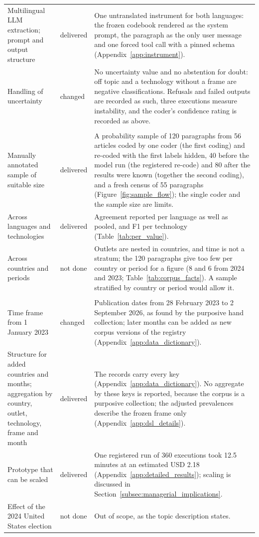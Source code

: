\begin{longtable}{@{}>{\raggedright\arraybackslash}p{32mm}>{\raggedright\arraybackslash}p{14mm}>{\raggedright\arraybackslash}p{106mm}@{}}
Multilingual LLM extraction; prompt and output structure & delivered & One untranslated instrument for both languages: the frozen codebook rendered as the system prompt, the paragraph as the only user message and one forced tool call with a pinned schema (Appendix~\ref{app:instrument}). \\
Handling of uncertainty & changed & No uncertainty value and no abstention for doubt: off topic and a technology without a frame are negative classifications. Refusals and failed outputs are recorded as such, three executions measure instability, and the coder's confidence rating is recorded as above. \\
\multicolumn{3}{@{}l}{\emph{Validation}} \\
Manually annotated sample of suitable size & delivered & A probability sample of 120 paragraphs from 56 articles coded by one coder (the first coding) and re-coded with the first labels hidden, 40 before the model run (the registered re-code) and 80 after the results were known (together the second coding), and a fresh census of 55 paragraphs (Figure~\ref{fig:sample_flow}); the single coder and the sample size are limits. \\
Across languages and technologies & delivered & Agreement reported per language as well as pooled, and F1 per technology (Table~\ref{tab:per_value}). \\
Across countries and periods & not done & Outlets are nested in countries, and time is not a stratum; the 120 paragraphs give too few per country or period for a figure (8 and 6 from 2024 and 2023; Table~\ref{tab:corpus_facts}). A sample stratified by country or period would allow it. \\
\multicolumn{3}{@{}l}{\emph{Time frame, data structure and scope}} \\
Time frame from 1 January 2023 & changed & Publication dates from 28 February 2023 to 2 September 2026, as found by the purposive hand collection; later months can be added as new corpus versions of the registry (Appendix~\ref{app:data_dictionary}). \\
Structure for added countries and months; aggregation by country, outlet, technology, frame and month & delivered & The records carry every key (Appendix~\ref{app:data_dictionary}). No aggregate by these keys is reported, because the corpus is a purposive collection; the adjusted prevalences describe the frozen frame only (Appendix~\ref{app:dsl_details}). \\
Prototype that can be scaled & delivered & One registered run of 360 executions took 12.5 minutes at an estimated USD 2.18 (Appendix~\ref{app:detailed_results}); scaling is discussed in Section~\ref{subsec:managerial_implications}. \\
Effect of the 2024 United States election & not done & Out of scope, as the topic description states. \\
\end{longtable}
\endgroup

